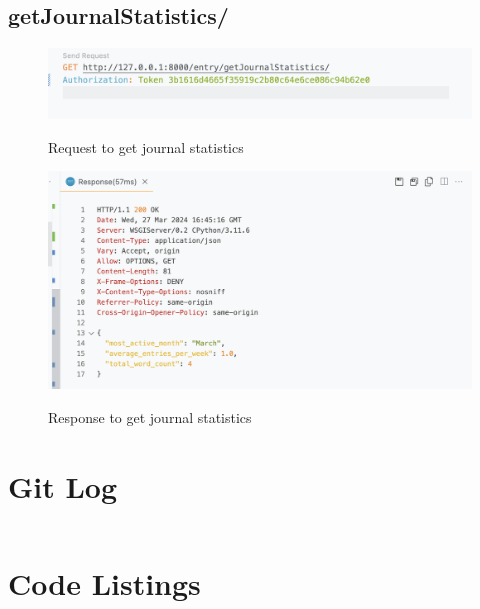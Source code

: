 \subsection{getJournalStatistics/}
\begin{figure}[H]
    \caption{Request to get journal statistics}
    \includegraphics[width=\textwidth]{Assets/api_test/request_get_journal_statistics.png}
    \label{fig:request_get_journal_statistics}
\end{figure}

\begin{figure}[H]
    \caption{Response to get journal statistics}
    \includegraphics[width=\textwidth]{Assets/api_test/response_get_journal_statistics.png}
    \label{fig:response_get_journal_statistics}
\end{figure}


\section{Git Log}
\inputminted{bash}{Assets/git_log.txt}

\section{Code Listings}
